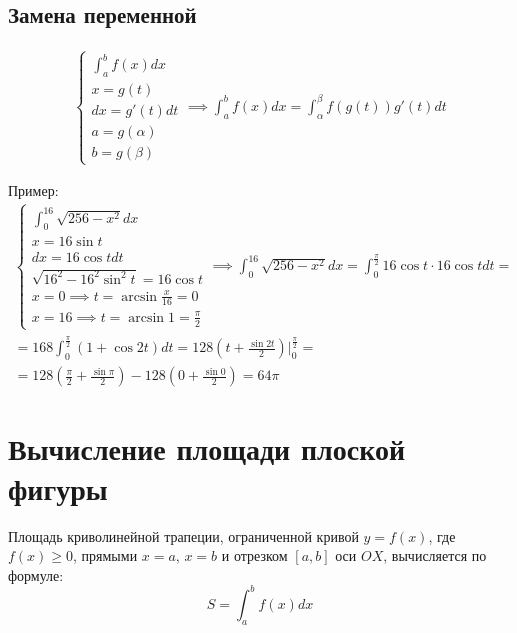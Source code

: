 \documentclass[a4paper,12pt,oneside]{extbook}
\theoremstyle{numbered}
\theoremstyle{unnumbered}
\theoremstyle{named}
\theoremstyle{unnumbered}
\theoremstyle{named}
\theoremstyle{named}
\theoremstyle{named}
\begin{document}
\subsection{Замена переменной}%
\label{sub:Замена переменной}

\begin{gather*}
    \begin{cases}
        \int_a^b f(x)dx \\
        x = g(t)        \\
        dx = g'(t)dt    \\
        a = g(\alpha)   \\
        b = g(\beta)
    \end{cases}
    \implies
    \int_a^b f(x)dx = \int_\alpha^\beta f(g(t)) g'(t)dt
\end{gather*}

Пример:
\begin{gather*}
    \begin{cases}
        \int_0^{16} \sqrt{256 - x^2}dx               \\
        x = 16\sin{t}                                \\
        dx = 16\cos{t}dt                             \\
        \sqrt{16^2 - 16^2\sin^2{t}} = 16\cos{t}      \\
        x = 0 \implies t = \arcsin{\frac{x}{16}} = 0 \\
        x = 16 \implies t = \arcsin{1} = \frac{\pi}{2}
    \end{cases}
    \implies
    \int_0^{16} \sqrt{256 - x^2}dx = \int_0^{\frac{\pi}{2}} 16\cos{t} \cdot 16\cos{t}dt = \\
    = 168 \int_0^{\frac{\pi}{2}} (1 + \cos{2t})dt = 128(t + \frac{\sin{2t}}{2}) |_0^{\frac{\pi}{2}} = \\
    = 128(\frac{\pi}{2} + \frac{\sin{\pi}}{2}) - 128(0 + \frac{\sin{0}}{2}) = 64\pi
\end{gather*}

\section{Вычисление площади плоской фигуры}%
\label{sec:Вычисление площади плоской фигуры}

Площадь криволинейной трапеции, ограниченной кривой \(y = f(x)\), где \(f(x) \geq 0\), прямыми \(x = a\), \(x = b\) и отрезком \([a, b]\) оси \(OX\), вычисляется по формуле:
\[
    S = \int_a^b f(x)dx
\]
\end{document}
